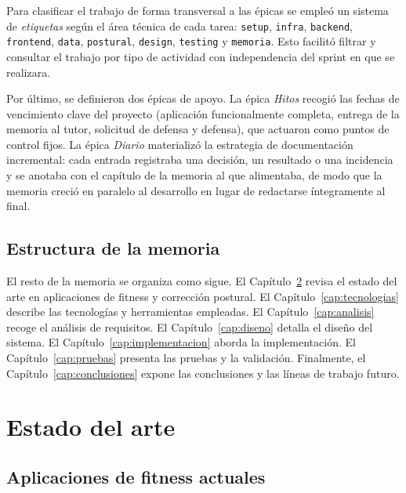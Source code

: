 \documentclass[12pt,a4paper,twoside,openright]{book}
\begin{document}
    Para clasificar el trabajo de forma transversal a las épicas se empleó un
    sistema de \textit{etiquetas} según el área técnica de cada tarea:
    \texttt{setup}, \texttt{infra}, \texttt{backend}, \texttt{frontend},
    \texttt{data}, \texttt{postural}, \texttt{design}, \texttt{testing} y
    \texttt{memoria}. Esto facilitó filtrar y consultar el trabajo por tipo de
    actividad con independencia del sprint en que se realizara.

    Por último, se definieron dos épicas de apoyo. La épica \textit{Hitos}
    recogió las fechas de vencimiento clave del proyecto (aplicación
    funcionalmente completa, entrega de la memoria al tutor, solicitud de defensa
    y defensa), que actuaron como puntos de control fijos. La épica
    \textit{Diario} materializó la estrategia de documentación incremental: cada
    entrada registraba una decisión, un resultado o una incidencia y se anotaba
    con el capítulo de la memoria al que alimentaba, de modo que la memoria
    creció en paralelo al desarrollo en lugar de redactarse íntegramente al final.


    \section{Estructura de la memoria}
    
    El resto de la memoria se organiza como sigue. El Capítulo~\ref{cap:estado-del-arte}
    revisa el estado del arte en aplicaciones de fitness y corrección postural.
    El Capítulo~\ref{cap:tecnologias} describe las tecnologías y herramientas
    empleadas. El Capítulo~\ref{cap:analisis} recoge el análisis de
    requisitos. El Capítulo~\ref{cap:diseno} detalla el diseño del sistema. El
    Capítulo~\ref{cap:implementacion} aborda la implementación. El
    Capítulo~\ref{cap:pruebas} presenta las pruebas y la validación. Finalmente,
    el Capítulo~\ref{cap:conclusiones} expone las conclusiones y las líneas de
    trabajo futuro.




    \chapter{Estado del arte}
    \label{cap:estado-del-arte}

\section{Aplicaciones de fitness actuales}
\end{document}
